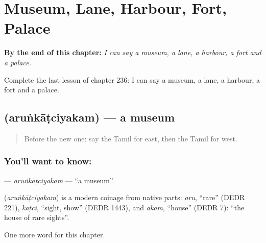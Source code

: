 
\chapter{Museum, Lane, Harbour, Fort, Palace}
\label{ch:ta-museum-lane-harbour-fort-palace}

\begin{chapteropening}
\textbf{By the end of this chapter:} \emph{I can say a museum, a lane, a harbour, a fort and a palace.}

Complete the last lesson of chapter 236: I can say a museum, a lane, a harbour, a fort and a palace.
\end{chapteropening}

\section[\texorpdfstring{\ta{அருங்காட்சியகம்} (aruṅkāṭciyakam)}{அருங்காட்சியகம் (aruṅkāṭciyakam)}]{ (aruṅkāṭciyakam) — a museum}

\label{lesson:TA-C236-arunkatciyakam}



\begin{quote}
Before the new one: say the Tamil for east, then the Tamil for west.
\end{quote}

\subsection*{You'll want to know: }
\textbf{} — \emph{aruṅkāṭciyakam} — \textquotedblleft{}a museum\textquotedblright{}.

\begin{cousinweb}
\textbf{} (\emph{aruṅkāṭciyakam}) is a modern coinage from native parts: \emph{aru}, \textquotedblleft{}rare\textquotedblright{} (DEDR 221), \emph{kāṭci}, \textquotedblleft{}sight, show\textquotedblright{} (DEDR 1443), and \emph{akam}, \textquotedblleft{}house\textquotedblright{} (DEDR 7): \textquotedblleft{}the house of rare sights\textquotedblright{}.
\end{cousinweb}

\begin{grammarlens}[title={What you've built}]
One more word for this chapter.
\end{grammarlens}

